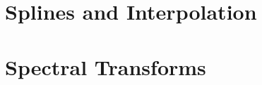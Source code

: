 \documentclass[../../CompleteThesis/Complete_1stDraft.tex]{subfiles}
\begin{document}
\section[Splines and Interpolation]{Splines and Interpolation}	

\section[Spectral Transforms]{Spectral Transforms}	
\end{document}
